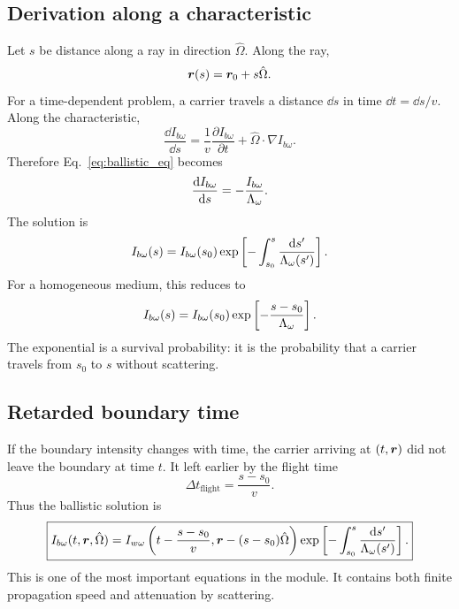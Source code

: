 \documentclass[11pt]{article}
\begin{document}
\subsection{Derivation along a characteristic}
Let \(s\) be distance along a ray in direction \(\hat{\Omega}\). Along the ray,
\begin{equation}
    \bm{r}(s)=\bm{r}_0+s\hat{\Omega}.
\end{equation}
For a time-dependent problem, a carrier travels a distance \(\dd s\) in time \(\dd t=\dd s/v\). Along the characteristic,
\begin{equation}
    \frac{\dd I_{b\omega}}{\dd s}
    =\frac{1}{v}\frac{\partial I_{b\omega}}{\partial t}
    +\hat{\Omega}\cdot\nabla I_{b\omega}.
\end{equation}
Therefore Eq.~\eqref{eq:ballistic_eq} becomes
\begin{equation}
    \frac{\dd I_{b\omega}}{\dd s}=-\frac{I_{b\omega}}{\Lambda_\omega}.
\end{equation}
The solution is
\begin{equation}
    I_{b\omega}(s)=I_{b\omega}(s_0)\exp\left[-\int_{s_0}^{s}\frac{\dd s'}{\Lambda_\omega(s')}\right].
\end{equation}
For a homogeneous medium, this reduces to
\begin{equation}
    I_{b\omega}(s)=I_{b\omega}(s_0)\exp\left[-\frac{s-s_0}{\Lambda_\omega}\right].
\end{equation}
The exponential is a survival probability: it is the probability that a carrier travels from \(s_0\) to \(s\) without scattering.

\subsection{Retarded boundary time}
If the boundary intensity changes with time, the carrier arriving at \((t,\bm{r})\) did not leave the boundary at time \(t\). It left earlier by the flight time
\begin{equation}
    \Delta t_{\mathrm{flight}}=\frac{s-s_0}{v}.
\end{equation}
Thus the ballistic solution is
\begin{equation}
    \boxed{I_{b\omega}(t,\bm{r},\hat{\Omega})
    =I_{w\omega}\left(t-\frac{s-s_0}{v},\bm{r}-(s-s_0)\hat{\Omega}\right)
    \exp\left[-\int_{s_0}^{s}\frac{\dd s'}{\Lambda_\omega(s')}\right].}
    \label{eq:ballistic_solution}
\end{equation}
This is one of the most important equations in the module. It contains both finite propagation speed and attenuation by scattering.
\end{document}
